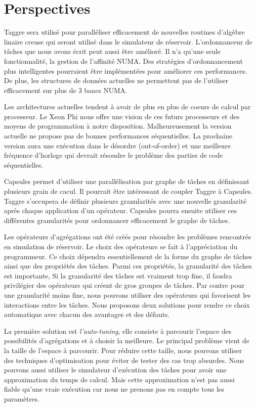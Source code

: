 \section{Perspectives}
Taggre sera utilisé pour paralléliser efficacement de nouvelles routines d'algèbre linaire creuse qui seront utilisé dans le simulateur de réservoir.
%
L'ordonnanceur de tâches que nous avons écrit peut aussi être amélioré.
%
Il n'a qu'une seule fonctionnalité, la gestion de l'affinité NUMA.
%
Des stratégies d'ordonnancement plus intelligentes pourraient être implémentées pour améliorer ces performances.
%
De plus, les structures de données actuelles ne permettent pas de l'utiliser efficacement sur plus de 3 bancs NUMA.


Les architectures actuelles tendent à avoir de plus en plus de coeurs de calcul par processeur.
%
Le Xeon Phi nous offre une vision de ces futurs processeurs et des moyens de programmation à notre disposition.
%
Malheureusement la version actuelle ne propose pas de bonnes performances séquentielles.
%
La prochaine version aura une exécution dans le désordre (out-of-order) et une meilleure fréquence d'horloge qui devrait résoudre le problème des parties de code séquentielles.


Capsules permet d'utiliser une parallélisation par graphe de tâches en définissant plusieurs grain de cacul.
%
Il pourrait être intéressant de coupler Taggre à Capsules.
%
Taggre s'occupera de définir plusieurs granularités avec une nouvelle granularité après chaque application d'un opérateur.
%
Capsules pourra ensuite utiliser ces différentes granularités pour ordonnancer efficacement le graphe de tâches.


Les opérateurs d'agrégations ont été créés pour résoudre les problèmes rencontrés en simulation de réservoir.
%
Le choix des opérateurs se fait à l'appréciation du programmeur.
%
Ce choix dépendra essentiellement de la forme du graphe de tâches ainsi que des propriétés des tâches.
%
Parmi ces propriétés, la granularité des tâches est importante,
%
Si la granularité des tâches est vraiment trop fine, il faudra privilégier des opérateurs qui créent de gros groupes de tâches.
%
Par contre pour une granularité moins fine, nous pouvons utiliser des opérateurs qui favorisent les interactions entre les tâches.
%
Nous proposons deux solutions pour rendre ce choix automatique avec chacun des avantages et des défauts.


La première solution est {\em l'auto-tuning}, elle consiste à parcourir l'espace des possibilités d'agrégations et à choisir la meilleure.
%
Le principal problème vient de la taille de l'espace à parcourir.
%
Pour réduire cette taille, nous pouvons utiliser des techniques d'optimisation pour éviter de tester des cas trop absurdes.
%
Nous pouvons aussi utiliser le simulateur d'exécution des tâches pour avoir une approximation du temps de calcul.
%
Mais cette approximation n'est pas aussi fiable qu'une vraie exécution car nous ne prenons pas en compte tous les paramètres.


